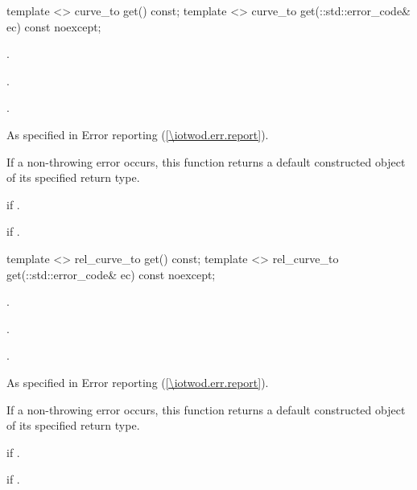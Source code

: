 \begin{itemdecl}
    template <>
    curve_to get() const;
    template <>
    curve_to get(::std::error_code& ec) const noexcept;
\end{itemdecl}
\begin{itemdescr}
	\pnum
	\preconditions
	.
	
	\pnum
	.
	
	\pnum
	\returns
	.
	
	\pnum
	\throws
	As specified in Error reporting (\ref{\iotwod.err.report}).
	
	\pnum
	\remarks
	If a non-throwing error occurs, this function returns a default constructed object of its specified return type.
	
	\pnum
	\errors
	 if .
	
	\pnum
	 if .

\end{itemdescr}

\begin{itemdecl}
    template <>
    rel_curve_to get() const;
    template <>
    rel_curve_to get(::std::error_code& ec) const noexcept;
\end{itemdecl}
\begin{itemdescr}
	\pnum
	\preconditions
	.
	
	\pnum
	.
	
	\pnum
	\returns
	.
	
	\pnum
	\throws
	As specified in Error reporting (\ref{\iotwod.err.report}).
	
	\pnum
	\remarks
	If a non-throwing error occurs, this function returns a default constructed object of its specified return type.
	
	\pnum
	\errors
	 if .
	
	\pnum
	 if .

\end{itemdescr}

